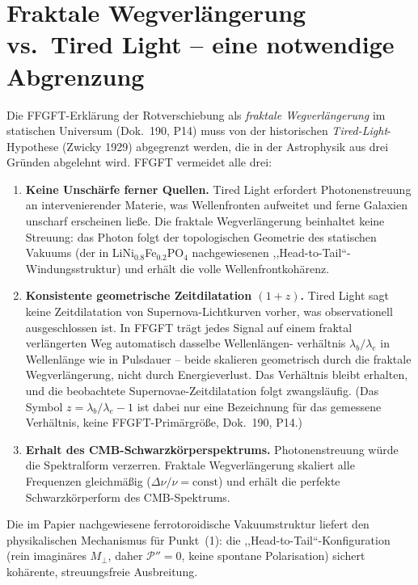 \section{Fraktale Wegverlängerung vs.\ Tired Light -- eine notwendige Abgrenzung}

Die FFGFT-Erklärung der Rotverschiebung als \emph{fraktale Wegverlängerung}
im statischen Universum (Dok.~190, P14) muss von der historischen
\emph{Tired-Light}-Hypothese (Zwicky 1929) abgegrenzt werden, die in der
Astrophysik aus drei Gründen abgelehnt wird. FFGFT vermeidet alle drei:

\begin{enumerate}
  \item \textbf{Keine Unschärfe ferner Quellen.} Tired Light erfordert
        Photonenstreuung an intervenierender Materie, was Wellenfronten
        aufweitet und ferne Galaxien unscharf erscheinen ließe. Die fraktale
        Wegverlängerung beinhaltet keine Streuung: das Photon folgt der
        topologischen Geometrie des statischen Vakuums (der in
        LiNi$_{0.8}$Fe$_{0.2}$PO$_4$ nachgewiesenen ,,Head-to-Tail``-
        Windungsstruktur) und erhält die volle Wellenfrontkohärenz.
  \item \textbf{Konsistente geometrische Zeitdilatation $(1+z)$.} Tired Light
        sagt keine Zeitdilatation von Supernova-Lichtkurven vorher, was
        observationell ausgeschlossen ist. In FFGFT trägt jedes Signal auf
        einem fraktal verlängerten Weg automatisch dasselbe Wellenlängen-
        verhältnis $\lambda_b/\lambda_e$ in Wellenlänge wie in Pulsdauer --
        beide skalieren geometrisch durch die fraktale Wegverlängerung, nicht
        durch Energieverlust. Das Verhältnis bleibt erhalten, und die
        beobachtete Supernovae-Zeitdilatation folgt zwangsläufig.
        (Das Symbol $z = \lambda_b/\lambda_e - 1$ ist dabei nur eine
        Bezeichnung für das gemessene Verhältnis, keine FFGFT-Primärgröße,
        Dok.~190, P14.)
  \item \textbf{Erhalt des CMB-Schwarzkörperspektrums.} Photonenstreuung
        würde die Spektralform verzerren. Fraktale Wegverlängerung skaliert
        alle Frequenzen gleichmäßig ($\Delta\nu/\nu = \mathrm{const}$) und
        erhält die perfekte Schwarzkörperform des CMB-Spektrums.
\end{enumerate}

\noindent Die im Papier nachgewiesene ferrotoroidische Vakuumstruktur liefert
den physikalischen Mechanismus für Punkt~(1): die ,,Head-to-Tail``-Konfiguration
(rein imaginäres $M_\perp$, daher $\mathcal{P}''=0$, keine spontane Polarisation)
sichert kohärente, streuungsfreie Ausbreitung.

